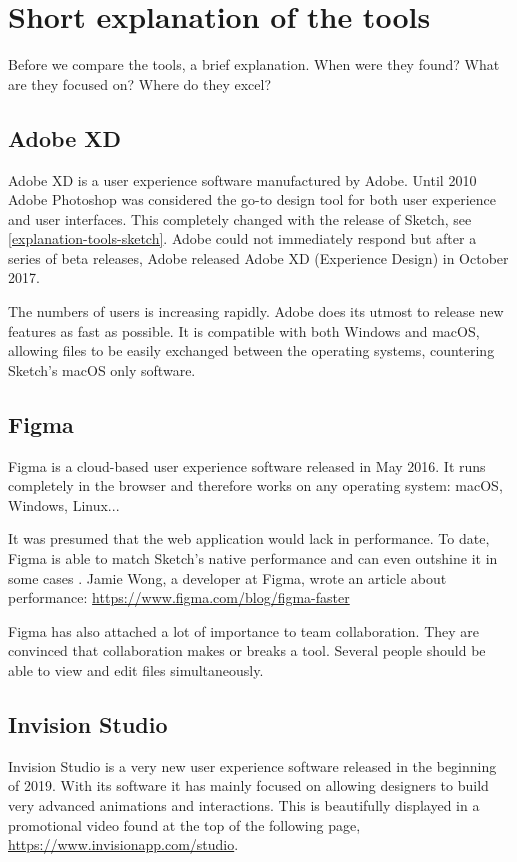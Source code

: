 \chapter{Short explanation of the tools}\label{explanation-tools}
Before we compare the tools, a brief explanation. When were they found? What are they focused on? Where do they excel? 

\section{Adobe XD}
Adobe XD is a user experience software manufactured by Adobe. Until 2010 Adobe Photoshop was considered the go-to design tool for both user experience and user interfaces. This completely changed with the release of Sketch, see \autoref{explanation-tools-sketch}. Adobe could not immediately respond but after a series of beta releases, Adobe released Adobe XD (Experience Design) in October 2017. 

The numbers of users is increasing rapidly. Adobe does its utmost to release new features as fast as possible. It is compatible with both Windows and macOS, allowing files to be easily exchanged between the operating systems, countering Sketch's macOS only software.

\section{Figma}
Figma is a cloud-based user experience software released in May 2016. It runs completely in the browser and therefore works on any operating system: macOS, Windows, Linux... 

It was presumed that the web application would lack in performance. To date, Figma is able to match Sketch's native performance and can even outshine it in some cases . Jamie Wong, a developer at Figma, wrote an article about performance: \url{https://www.figma.com/blog/figma-faster}

Figma has also attached a lot of importance to team collaboration. They are convinced that collaboration makes or breaks a tool. Several people should be able to view and edit files simultaneously.

\section{Invision Studio}\label{sec:invision-explanation}
Invision Studio is a very new user experience software released in the beginning of 2019. With its software it has mainly focused on allowing designers to build very advanced animations and interactions. This is beautifully displayed in a promotional video found at the top of the following page, \url{https://www.invisionapp.com/studio}.

